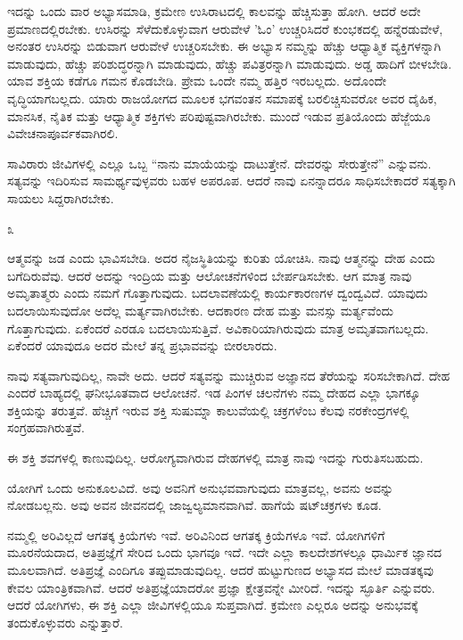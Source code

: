 ಇದನ್ನು ಒಂದು ವಾರ ಅಭ್ಯಾಸಮಾಡಿ, ಕ್ರಮೇಣ ಉಸಿರಾಟದಲ್ಲಿ ಕಾಲವನ್ನು ಹೆಚ್ಚಿಸುತ್ತಾ ಹೋಗಿ. ಆದರೆ ಅದೇ ಪ್ರಮಾಣದಲ್ಲಿರಬೇಕು. ಉಸಿರನ್ನು ಸೆಳೆದುಕೊಳ್ಳುವಾಗ ಆರುವೇಳೆ 'ಓಂ' ಉಚ್ಚರಿಸಿದರೆ ಕುಂಭಕದಲ್ಲಿ ಹನ್ನೆರಡುವೇಳೆ, ಅನಂತರ ಉಸಿರನ್ನು ಬಿಡುವಾಗ ಆರುವೇಳೆ ಉಚ್ಚರಿಸಬೇಕು. ಈ ಅಭ್ಯಾಸ ನಮ್ಮನ್ನು ಹೆಚ್ಚು ಆಧ್ಯಾತ್ಮಿಕ ವ್ಯಕ್ತಿಗಳನ್ನಾಗಿ ಮಾಡುವುದು, ಹೆಚ್ಚು ಪರಿಶುದ್ಧರನ್ನಾಗಿ ಮಾಡುವುದು, ಹೆಚ್ಚು ಪವಿತ್ರರನ್ನಾಗಿ ಮಾಡುವುದು. ಅಡ್ಡ ಹಾದಿಗೆ ಬೀಳಬೇಡಿ. ಯಾವ ಶಕ್ತಿಯ ಕಡೆಗೂ ಗಮನ ಕೊಡಬೇಡಿ. ಪ್ರೇಮ ಒಂದೇ ನಮ್ಮ ಹತ್ತಿರ ಇರಬಲ್ಲದು. ಅದೊಂದೇ ವೃದ್ಧಿಯಾಗಬಲ್ಲದು. ಯಾರು ರಾಜಯೋಗದ ಮೂಲಕ ಭಗವಂತನ ಸಮಾಪಕ್ಕೆ ಬರಲಿಚ್ಚಿಸುವರೋ ಅವರ ದೈಹಿಕ, ಮಾನಸಿಕ, ನೈತಿಕ ಮತ್ತು ಆಧ್ಯಾತ್ಮಿಕ ಶಕ್ತಿಗಳು ಪರಿಪುಷ್ಟವಾಗಿರಬೇಕು. ಮುಂದೆ ಇಡುವ ಪ್ರತಿಯೊಂದು ಹೆಜ್ಜೆಯೂ ವಿವೇಚನಾಪೂರ್ವಕವಾಗಿರಲಿ.

ಸಾವಿರಾರು ಜೀವಿಗಳಲ್ಲಿ ಎಲ್ಲೂ ಒಬ್ಬ “ನಾನು ಮಾಯೆಯನ್ನು ದಾಟುತ್ತೇನೆ. ದೇವರನ್ನು ಸೇರುತ್ತೇನೆ'' ಎನ್ನುವನು. ಸತ್ಯವನ್ನು ಇದಿರಿಸುವ ಸಾಮರ್ಥ್ಯವುಳ್ಳವರು ಬಹಳ ಅಪರೂಪ. ಆದರೆ ನಾವು ಏನನ್ನಾದರೂ ಸಾಧಿಸಬೇಕಾದರೆ ಸತ್ಯಕ್ಕಾಗಿ ಸಾಯಲು ಸಿದ್ದರಾಗಿರಬೇಕು.

\begin{center}
೩
\end{center}

ಆತ್ಮವನ್ನು ಜಡ ಎಂದು ಭಾವಿಸಬೇಡಿ. ಅದರ ನೈಜಸ್ಥಿತಿಯನ್ನು ಕುರಿತು ಯೋಚಿಸಿ. ನಾವು ಆತ್ಮನನ್ನು ದೇಹ ಎಂದು ಬಗೆದಿರುವೆವು. ಆದರೆ ಅದನ್ನು ಇಂದ್ರಿಯ ಮತ್ತು ಆಲೋಚನೆಗಳಿಂದ ಬೇರ್ಪಡಿಸಬೇಕು. ಆಗ ಮಾತ್ರ ನಾವು ಅಮೃತಾತ್ಮರು ಎಂದು ನಮಗೆ ಗೊತ್ತಾಗುವುದು. ಬದಲಾವಣೆಯಲ್ಲಿ ಕಾರ್ಯಕಾರಣಗಳ ದ್ವಂದ್ವವಿದೆ. ಯಾವುದು ಬದಲಾಯಿಸುವುದೋ ಅದೆಲ್ಲ ಮರ್ತ್ಯವಾಗಿರಬೇಕು. ಆದಕಾರಣ ದೇಹ ಮತ್ತು ಮನಸ್ಸು ಮರ್ತ್ಯವೆಂದು ಗೊತ್ತಾಗುವುದು. ಏಕೆಂದರೆ ಎರಡೂ ಬದಲಾಯಿಸುತ್ತಿವೆ. ಅವಿಕಾರಿಯಾಗಿರುವುದು ಮಾತ್ರ ಅಮೃತವಾಗಬಲ್ಲದು. ಏಕೆಂದರೆ ಯಾವುದೂ ಅದರ ಮೇಲೆ ತನ್ನ ಪ್ರಭಾವವನ್ನು ಬೀರಲಾರದು.

ನಾವು ಸತ್ಯವಾಗುವುದಿಲ್ಲ, ನಾವೇ ಅದು. ಆದರೆ ಸತ್ಯವನ್ನು ಮುಚ್ಚಿರುವ ಅಜ್ಞಾನದ ತೆರೆಯನ್ನು ಸರಿಸಬೇಕಾಗಿದೆ. ದೇಹ ಎಂದರೆ ಬಾಹ್ಯದಲ್ಲಿ ಘನೀಭೂತವಾದ ಆಲೋಚನೆ. ಇಡ ಪಿಂಗಳ ಚಲನೆಗಳು ನಮ್ಮ ದೇಹದ ಎಲ್ಲಾ ಭಾಗಕ್ಕೂ ಶಕ್ತಿಯನ್ನು ತರುತ್ತವೆ. ಹೆಚ್ಚಿಗೆ ಇರುವ ಶಕ್ತಿ ಸುಷುಮ್ನಾ ಕಾಲುವೆಯಲ್ಲಿ ಚಕ್ರಗಳೆಂಬ ಕೆಲವು ನರಕೇಂದ್ರಗಳಲ್ಲಿ ಸಂಗ್ರಹವಾಗಿರುತ್ತವೆ.

ಈ ಶಕ್ತಿ ಶವಗಳಲ್ಲಿ ಕಾಣುವುದಿಲ್ಲ. ಆರೋಗ್ಯವಾಗಿರುವ ದೇಹಗಳಲ್ಲಿ ಮಾತ್ರ ನಾವು ಇದನ್ನು ಗುರುತಿಸಬಹುದು.

ಯೋಗಿಗೆ ಒಂದು ಅನುಕೂಲವಿದೆ. ಅವು ಅವನಿಗೆ ಅನುಭವವಾಗುವುದು ಮಾತ್ರವಲ್ಲ, ಅವನು ಅವನ್ನು ನೋಡಬಲ್ಲನು. ಅವು ಅವನ ಜೀವನದಲ್ಲಿ ಜಾಜ್ವಲ್ಯಮಾನವಾಗಿವೆ. ಹಾಗೆಯೆ ಷಟ್‌ಚಕ್ರಗಳು ಕೂಡ.

ನಮ್ಮಲ್ಲಿ ಅರಿವಿಲ್ಲದೆ ಆಗತಕ್ಕ ಕ್ರಿಯೆಗಳು ಇವೆ. ಅರಿವಿನಿಂದ ಆಗತಕ್ಕ ಕ್ರಿಯೆಗಳೂ ಇವೆ. ಯೋಗಿಗಳಿಗೆ ಮೂರನೆಯದಾದ, ಅತಿಪ್ರಜ್ಞೆಗೆ ಸೇರಿದ ಒಂದು ಭಾಗವೂ ಇದೆ. ಇದೇ ಎಲ್ಲಾ ಕಾಲದೇಶಗಳಲ್ಲೂ ಧಾರ್ಮಿಕ ಜ್ಞಾನದ ಮೂಲವಾಗಿದೆ. ಅತಿಪ್ರಜ್ಞೆ ಎಂದಿಗೂ ತಪ್ಪುಮಾಡುವುದಿಲ್ಲ. ಆದರೆ ಹುಟ್ಟುಗುಣದ ಅಭ್ಯಾಸದ ಮೇಲೆ ಮಾಡತಕ್ಕವು ಕೇವಲ ಯಾಂತ್ರಿಕವಾಗಿವೆ. ಆದರೆ ಅತಿಪ್ರಜ್ಞೆಯಾದರೋ ಪ್ರಜ್ಞಾ ಕ್ಷೇತ್ರವನ್ನೇ ಮೀರಿದೆ. ಇದನ್ನು ಸ್ಫೂರ್ತಿ ಎನ್ನುವರು. ಆದರೆ ಯೋಗಿಗಳು, ಈ ಶಕ್ತಿ ಎಲ್ಲಾ ಜೀವಿಗಳಲ್ಲಿಯೂ ಸುಪ್ತವಾಗಿದೆ. ಕ್ರಮೇಣ ಎಲ್ಲರೂ ಅದನ್ನು ಅನುಭವಕ್ಕೆ ತಂದುಕೊಳ್ಳುವರು ಎನ್ನುತ್ತಾರೆ.

